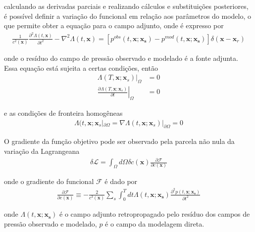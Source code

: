 calculando as derivadas parciais e realizando cálculos e substituições posteriores, é possível definir a variação do funcional em relação aos parâmetros do modelo, o que permite obter a equação para o campo adjunto, onde é expresso por 
\begin{eqnarray}
 \frac{1}{c^{2}(\mathbf{x})} \frac{\partial^{2} \Lambda(t, \mathbf{x})}{\partial t^{2}}-\nabla^{2} \Lambda(t, \mathbf{x})=\left[p^{o b s}\left(t, \mathbf{x} ; \mathbf{x}_{\mathbf{s}}\right)-p^{mod}\left(t, \mathbf{x} ; \mathbf{x}_{\mathbf{s}}\right)\right] \delta\left(\mathbf{x}-\mathbf{x}_{r}\right)
 \label{campoadjunto}
\end{eqnarray}

onde o resíduo do campo de pressão observado e modelado é a fonte adjunta. Essa equação está sujeita a certas condições, então 
\begin{eqnarray}
\left.\Lambda\left(T, \mathbf{x} ; \mathbf{x}_{s}\right)\right|_{\Omega} &=0 \\ \nonumber
\left.\frac{\partial \Lambda\left(T, \mathbf{x} ; \mathbf{x}_{s}\right)}{\partial t}\right|_{\Omega} &=0
\end{eqnarray}

e as condições de fronteira homogêneas
\begin{eqnarray}
 \Lambda (t, \mathbf{x}; \mathbf{x}_{s} |_{\partial \Omega} = \nabla \Lambda (t,\mathbf{x};\mathbf{x}_{s}) |_{\partial \Omega} = 0
\end{eqnarray}

O gradiente da função objetivo pode ser observado pela parcela não nula da variação da Lagrangeana 
\begin{eqnarray}
 \delta \mathcal{L}=\int_{\Omega} d \Omega \delta c(\mathbf{x}) \frac{\partial \mathcal{F}}{\partial c(\mathbf{x})}
\end{eqnarray}

onde o gradiente do funcional $\mathcal{F}$ é dado por 
\begin{eqnarray}
 \frac{\partial \mathcal{F}}{\partial c(\mathbf{x})} \equiv-\frac{2}{c^{3}(\mathbf{x})} \sum_{s} \int_{0}^{T} d t \Lambda\left(t, \mathbf{x} ; \mathbf{x}_{\mathbf{s}}\right) \frac{\partial^{2} p\left(t, \mathbf{x} ; \mathbf{x}_{\mathbf{s}}\right)}{\partial t^{2}}
\end{eqnarray}


  onde $\Lambda\left(t, \mathbf{x} ; \mathbf{x}_{\mathbf{s}}\right)$ é o campo adjunto retropropagado pelo resíduo dos campos de pressão observado e modelado, $p$ é o campo da modelagem direta.
\newpage
